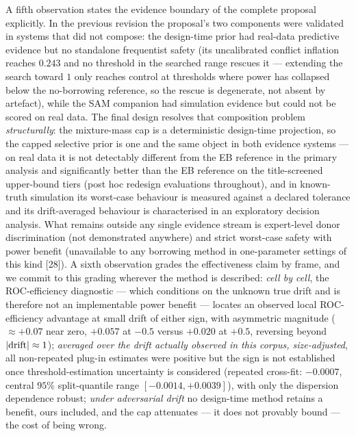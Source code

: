 \documentclass[11pt]{article}
\begin{document}
A fifth observation states the evidence boundary of the complete proposal
explicitly. In the previous revision the proposal's two components were
validated in systems that did not compose: the design-time prior had
real-data predictive evidence but no standalone frequentist safety (its
uncalibrated conflict inflation reaches $0.243$ and no threshold in the
searched range rescues it --- extending the search toward $1$ only reaches
control at thresholds where power has collapsed below the no-borrowing
reference, so the rescue is degenerate, not absent by artefact), while the
SAM companion had simulation evidence but could not be scored on real data.
The final design resolves that composition problem \emph{structurally}: the
mixture-mass cap is a deterministic design-time projection, so the capped
selective prior is one and the same object in both evidence systems --- on
real data it is not detectably different from the EB reference in the
primary analysis and
significantly better
than the EB reference on the title-screened upper-bound tiers (post hoc
redesign evaluations throughout), and in
known-truth simulation its worst-case behaviour is measured against a
declared tolerance and its drift-averaged behaviour is characterised in an
exploratory decision analysis. What
remains outside any single evidence stream is expert-level donor
discrimination (not demonstrated anywhere) and strict worst-case safety
with power benefit (unavailable to any borrowing method in one-parameter
settings of this kind [28]). A sixth
observation grades the effectiveness claim by frame, and we commit to this
grading wherever the method is described: \emph{cell by cell}, the
ROC-efficiency diagnostic --- which conditions on the unknown true drift
and is therefore not an implementable power benefit --- locates an
observed local ROC-efficiency advantage at small drift of either sign,
with asymmetric magnitude ($\approx +0.07$ near zero, $+0.057$ at $-0.5$
versus $+0.020$ at $+0.5$, reversing beyond
$|{\rm drift}| \approx 1$); \emph{averaged over the drift actually
observed in this corpus, size-adjusted}, all non-repeated plug-in
estimates were positive but the sign is not established once
threshold-estimation uncertainty is considered (repeated cross-fit:
$-0.0007$, central $95\%$ split-quantile range $[-0.0014,+0.0039]$), with only the
dispersion dependence robust; \emph{under adversarial
drift} no design-time method retains a benefit, ours included, and the cap
attenuates --- it does not provably bound --- the cost
of being wrong.
\end{document}
